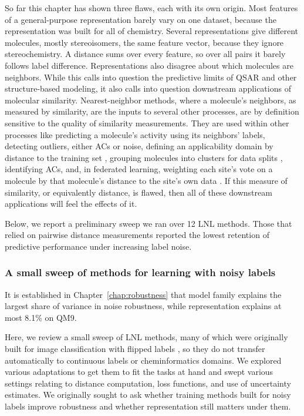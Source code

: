 So far this chapter has shown three flaws, each with its own origin. Most features of a general-purpose representation barely vary on one dataset, because the representation was built for all of chemistry. Several representations give different molecules, mostly stereoisomers, the same feature vector, because they ignore stereochemistry. A distance sums over every feature, so over all pairs it barely follows label difference. Representations also disagree about which molecules are neighbors. While this calls into question the predictive limits of QSAR and other structure-based modeling, it also calls into question downstream applications of molecular similarity. Nearest-neighbor methods, where a molecule's neighbors, as measured by similarity, are the inputs to several other processes, are by definition sensitive to the quality of similarity measurements. They are used within other processes like predicting a molecule's activity using its neighbors' labels, detecting outliers, either ACs or noise, defining an applicability domain by distance to the training set \citep{Tropsha2010}, grouping molecules into clusters for data splits \citep{Butina1999}, identifying ACs, and, in federated learning, weighting each site's vote on a molecule by that molecule's distance to the site's own data \citep{Hanser2025}. If this measure of similarity, or equivalently distance, is flawed, then all of these downstream applications will feel the effects of it.

Below, we report a preliminary sweep we ran over 12 LNL methods. Those that relied on pairwise distance measurements reported the lowest retention of predictive performance under increasing label noise. 

\subsubsection{A small sweep of methods for learning with noisy labels}\label{sec:lnl_motivation}

It is established in Chapter~\ref{chap:robustness} that model family explains the largest share of variance in noise robustness, while representation explains at most 8.1\% on QM9. 

Here, we review a small sweep of LNL methods, many of which were originally built for image classification with flipped labels \citep{Song2022}, so they do not transfer automatically to continuous labels or cheminformatics domains. We explored various adaptations to get them to fit the tasks at hand and swept various settings relating to distance computation, loss functions, and use of uncertainty estimates. We originally sought to ask whether training methods built for noisy labels improve robustness and whether representation still matters under them. 

